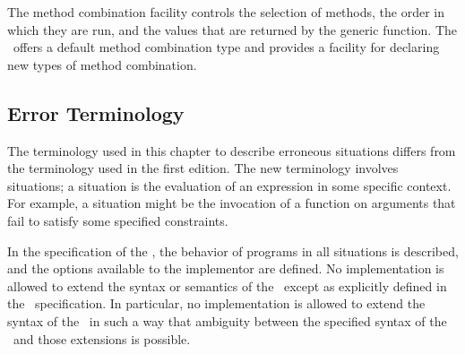 The method combination facility controls the selection of methods, the
order in which they are run, and the values that are returned by the
generic function.  The \CLOS\ offers a default method combination type
and provides a facility for declaring new types of method combination.


\subsection{Error Terminology}
\label{Error-Terminology-SECTION}

The terminology used in this chapter to describe erroneous
situations differs from the terminology used in the first edition.
The new terminology involves {\bit situations};
a situation is the evaluation of an expression in some
specific context. For example, a situation might be the invocation of
a function on arguments that fail to satisfy some specified
constraints.

In the specification of the \CLOS, the behavior of programs in all situations
is described, and the options available to the implementor are defined. No
implementation is allowed to extend the syntax or semantics of the \OS\ except
as explicitly defined in the \OS\ specification. In particular, no
implementation is allowed to extend the syntax of the \OS\ in such a way that
ambiguity between the specified syntax of the \OS\ and those extensions is
possible.

